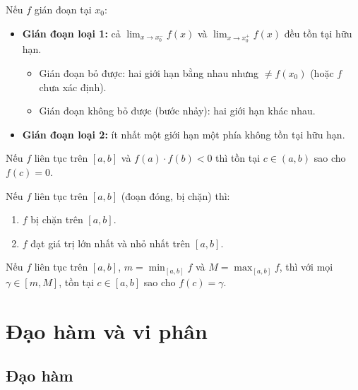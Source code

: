 \documentclass[12pt,a4paper]{article}
\begin{document}
\begin{dinhnghia}[title={Phân loại điểm gián đoạn}]
  Nếu $f$ gián đoạn tại $x_0$:
  \begin{itemize}
    \item \textbf{Gián đoạn loại 1:} cả $\displaystyle\lim_{x \to x_0^-} f(x)$ và $\displaystyle\lim_{x \to x_0^+} f(x)$ đều tồn tại hữu hạn.
    \begin{itemize}
      \item Gián đoạn bỏ được: hai giới hạn bằng nhau nhưng $\ne f(x_0)$ (hoặc $f$ chưa xác định).
      \item Gián đoạn không bỏ được (bước nhảy): hai giới hạn khác nhau.
    \end{itemize}
    \item \textbf{Gián đoạn loại 2:} ít nhất một giới hạn một phía không tồn tại hữu hạn.
  \end{itemize}
\end{dinhnghia}

\begin{dinhly}[title={Định lý giá trị trung gian (Bolzano)}]
  Nếu $f$ liên tục trên $[a,b]$ và $f(a) \cdot f(b) < 0$ thì tồn tại $c \in (a,b)$ sao cho $f(c) = 0$.
\end{dinhly}

\begin{dinhly}[title={Định lý Weierstrass}]
  Nếu $f$ liên tục trên $[a,b]$ (đoạn đóng, bị chặn) thì:
  \begin{enumerate}
    \item $f$ bị chặn trên $[a,b]$.
    \item $f$ đạt giá trị lớn nhất và nhỏ nhất trên $[a,b]$.
  \end{enumerate}
\end{dinhly}

\begin{dinhly}[title={Tính chất giá trị trung gian}]
  Nếu $f$ liên tục trên $[a,b]$, $m = \min_{[a,b]} f$ và $M = \max_{[a,b]} f$, thì với mọi $\gamma \in [m, M]$, tồn tại $c \in [a,b]$ sao cho $f(c) = \gamma$.
\end{dinhly}

\section{Đạo hàm và vi phân}

\subsection{Đạo hàm}
\end{document}
